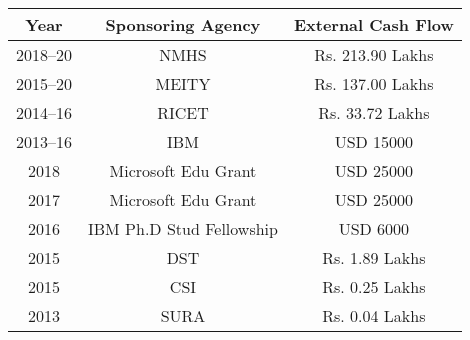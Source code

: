 	
	\begin{center}{\small
		\begin{tabular}{||c|c|c||}
			\hline \hline
			Year & Sponsoring Agency & External Cash Flow \\
			\hline \hline
			2018--20 & NMHS & Rs. 213.90 Lakhs \\  \hline
			2015--20 & MEITY & Rs. 137.00 Lakhs  \\ \hline
			2014--16 & RICET & Rs. 33.72 Lakhs  \\ \hline			
			2013--16 & IBM & USD 15000 \\ \hline			
			2018 & Microsoft Edu Grant & USD 25000 \\ \hline			
			2017 & Microsoft Edu Grant & USD 25000 \\ \hline
			2016 & IBM Ph.D Stud Fellowship & USD 6000 \\ \hline
			2015 & DST & Rs. 1.89 Lakhs \\ \hline
			2015 & CSI & Rs. 0.25 Lakhs \\ \hline
			2013 & SURA & Rs. 0.04 Lakhs \\
			
			\hline \hline 
	\end{tabular}}
\end{center}